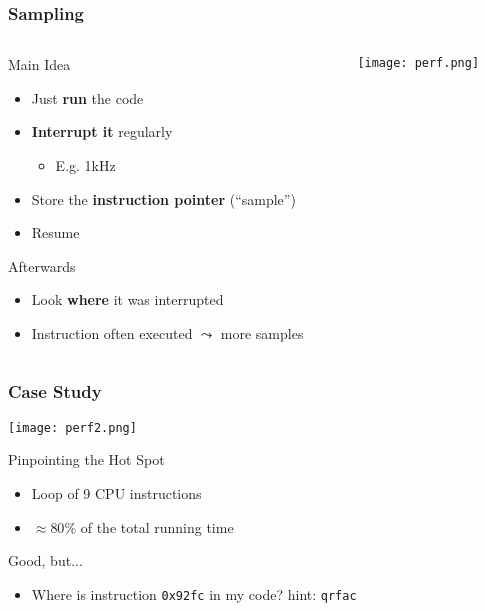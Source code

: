 \documentclass[xcolor={x11names,svgnames}]{beamer}
\begin{document}
\begin{frame}
  \frametitle{Sampling}

  \begin{columns}
    \begin{column}{5cm}
  \begin{block}{Main Idea}
    \begin{itemize}
    \item Just \textbf{run} the code
    \item \textbf{Interrupt it} regularly
      \begin{itemize}
      \item E.g. 1kHz
      \end{itemize}
    \item Store the \textbf{instruction pointer} (``sample'')
    \item Resume
    \end{itemize}    
  \end{block}

  \begin{exampleblock}{Afterwards}
    \begin{itemize}
    \item Look \textbf{where} it was interrupted
    \item Instruction often executed $\leadsto$ more samples
    \end{itemize}
  \end{exampleblock}
  
\end{column}
\begin{column}{6cm}
  \texttt{[image: perf.png]}
\end{column}
\end{columns}
\end{frame}


\begin{frame}
  \frametitle{Case Study}

  \noindent\texttt{[image: perf2.png]}

  \begin{alertblock}{Pinpointing the Hot Spot}
    \begin{itemize}
    \item Loop of 9 CPU instructions
    \item $\approx 80\%$ of the total running time 
    \end{itemize}
  \end{alertblock}
  
  \begin{block}{Good, but...}
    \begin{itemize}
    \item Where is instruction \texttt{0x92fc} in my code? {\tiny hint: \texttt{qrfac}}
    \end{itemize}
  \end{block}
\end{frame}
\end{document}
